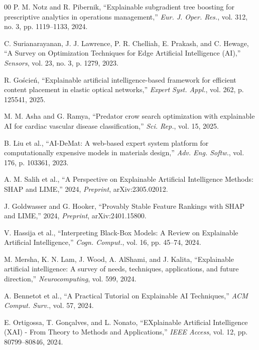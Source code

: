 \documentclass[conference]{IEEEtran}
\begin{document}
\begin{thebibliography}{00}
P. M. Notz and R. Pibernik, ``Explainable subgradient tree boosting for prescriptive analytics in operations management,'' \textit{Eur. J. Oper. Res.}, vol. 312, no. 3, pp. 1119--1133, 2024.

C. Surianarayanan, J. J. Lawrence, P. R. Chelliah, E. Prakash, and C. Hewage, ``A Survey on Optimization Techniques for Edge Artificial Intelligence (AI),'' \textit{Sensors}, vol. 23, no. 3, p. 1279, 2023.

R. Go\'{s}cie\'{n}, ``Explainable artificial intelligence-based framework for efficient content placement in elastic optical networks,'' \textit{Expert Syst. Appl.}, vol. 262, p. 125541, 2025.

M. M. Asha and G. Ramya, ``Predator crow search optimization with explainable AI for cardiac vascular disease classification,'' \textit{Sci. Rep.}, vol. 15, 2025.

B. Liu et al., ``AI-DeMat: A web-based expert system platform for computationally expensive models in materials design,'' \textit{Adv. Eng. Softw.}, vol. 176, p. 103361, 2023.

A. M. Salih et al., ``A Perspective on Explainable Artificial Intelligence Methods: SHAP and LIME,'' 2024, \textit{Preprint}, arXiv:2305.02012.

J. Goldwasser and G. Hooker, ``Provably Stable Feature Rankings with SHAP and LIME,'' 2024, \textit{Preprint}, arXiv:2401.15800.

V. Hassija et al., ``Interpreting Black-Box Models: A Review on Explainable Artificial Intelligence,'' \textit{Cogn. Comput.}, vol. 16, pp. 45--74, 2024.

M. Mersha, K. N. Lam, J. Wood, A. AlShami, and J. Kalita, ``Explainable artificial intelligence: A survey of needs, techniques, applications, and future direction,'' \textit{Neurocomputing}, vol. 599, 2024.

A. Bennetot et al., ``A Practical Tutorial on Explainable AI Techniques,'' \textit{ACM Comput. Surv.}, vol. 57, 2024.

E. Ortigossa, T. Gonçalves, and L. Nonato, ``EXplainable Artificial Intelligence (XAI) - From Theory to Methods and Applications,'' \textit{IEEE Access}, vol. 12, pp. 80799--80846, 2024.


\end{thebibliography}
\end{document}
